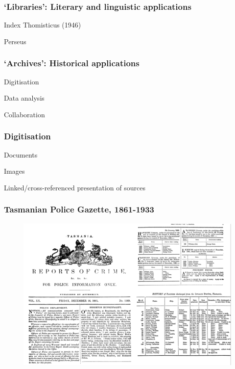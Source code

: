 \documentclass[ignorenonframetext,11pt]{beamer}
\begin{document}
\begin{frame}
\frametitle{`Libraries': Literary and linguistic applications}
\label{libraries:literaryandlinguisticapplications}

Index Thomisticus (1946)


Perseus



\end{frame}
		

\begin{frame}
\frametitle{`Archives': Historical applications}
\label{archives:historicalapplications}

Digitisation


Data analysis


Collaboration



\end{frame}
		

\begin{frame}
\frametitle{Digitisation}
\label{digitisation}

Documents


Images


Linked/cross-referenced presentation of sources



\end{frame}
		

\begin{frame}
\frametitle{Tasmanian Police Gazette, 1861-1933}
\label{tasmanianpolicegazette1861-1933}

\begin{figure}
	\label{policegazette}
	\begin{center}
	\includegraphics[keepaspectratio,width=\textwidth, height=.75\textheight]{images/police.png}
	\end{center}
	\end{figure}
	



\end{frame}
		
\end{document}
